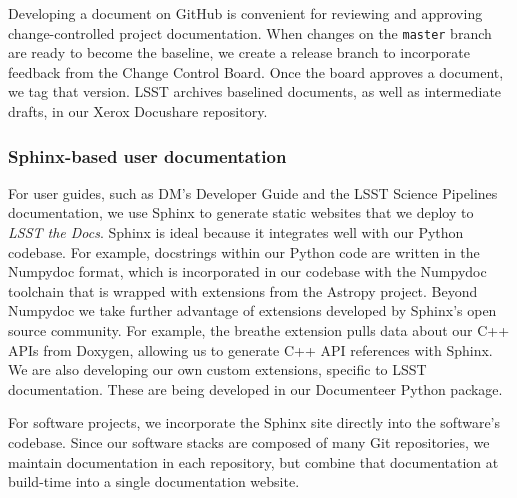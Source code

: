 Developing a document on GitHub is convenient for reviewing and approving change-controlled project documentation.
When changes on the \texttt{master} branch are ready to become the baseline, we create a release branch to incorporate feedback from the Change Control Board.
Once the board approves a document, we tag that version.
LSST archives baselined documents, as well as intermediate drafts, in our Xerox Docushare repository.

\subsubsection{Sphinx-based user documentation}
\label{sec:sphinx_tooling}

For user guides, such as DM's Developer Guide and the LSST Science Pipelines documentation, we use Sphinx to generate static websites that we deploy to \textit{LSST the Docs}.
Sphinx is ideal because it integrates well with our Python codebase.
For example, docstrings within our Python code are written in the Numpydoc\cite{numpydoc} format, which is incorporated in our codebase with the Numpydoc toolchain that is wrapped with extensions from the Astropy\cite{2018arXiv180102634T} project.
Beyond Numpydoc we take further advantage of extensions developed by Sphinx's open source community.
For example, the breathe extension pulls data about our C++ APIs from Doxygen, allowing us to generate C++ API references with Sphinx.
We are also developing our own custom extensions, specific to LSST documentation.
These are being developed in our Documenteer Python package.

For software projects, we incorporate the Sphinx site directly into the software's codebase.
Since our software stacks are composed of many Git repositories, we maintain documentation in each repository, but combine that documentation at build-time into a single documentation website.
